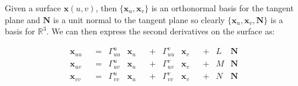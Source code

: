 \begin{prop}
\cite{EDG}
Given a surface $\mathbf x(u,v)$, then $\{\mathbf x_u, \mathbf x_v\}$ is an orthonormal basis for the tangent plane and $\mathbf N$ is a unit normal to the tangent plane so clearly $\{\mathbf x_u, \mathbf x_v, \mathbf N\}$ is a basis for $\mathbb{R}^3$. We can then express the second derivatives on the surface as:

\begin{align}
\nonumber
&\mathbf x_{uu}& &=& \Gamma^u_{uu} &\mathbf x_{u}& &+& \Gamma^v_{uu} &\mathbf x_{v}& &+& L &\mathbf N& \\
\nonumber
&\mathbf x_{uv}& &=& \Gamma^u_{uv} &\mathbf x_{u}& &+& \Gamma^v_{uv} &\mathbf x_{v}& &+& M &\mathbf N& \\
\nonumber
&\mathbf x_{vv}& &=& \Gamma^u_{vv} &\mathbf x_{u}& &+& \Gamma^v_{vv} &\mathbf x_{v}& &+& N &\mathbf N&
\end{align}
\end{prop}

